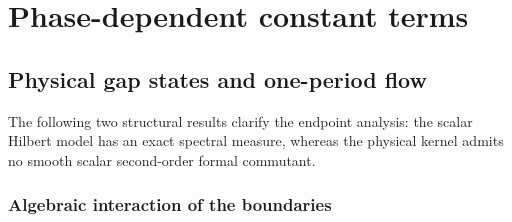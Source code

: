 \documentclass[11pt,a4paper]{article}
\theoremstyle{definition}
\numberwithin{equation}{section}
\begin{document}
\section{Phase-dependent constant terms}\label{unified:sec:phase}
\begingroup
\let\section\subsection
\let\subsection\subsubsection

\endgroup
\section{Physical gap states and one-period flow}\label{unified:sec:gap}
\begingroup
\let\section\subsection
\let\subsection\subsubsection



The following two structural results clarify the endpoint analysis: the scalar Hilbert model has an exact spectral measure, whereas the physical kernel admits no smooth scalar second-order formal commutant.


\endgroup
\section{Algebraic interaction of the boundaries}\label{unified:sec:interaction}
\begingroup
\let\section\subsection
\let\subsection\subsubsection


\endgroup
\end{document}
